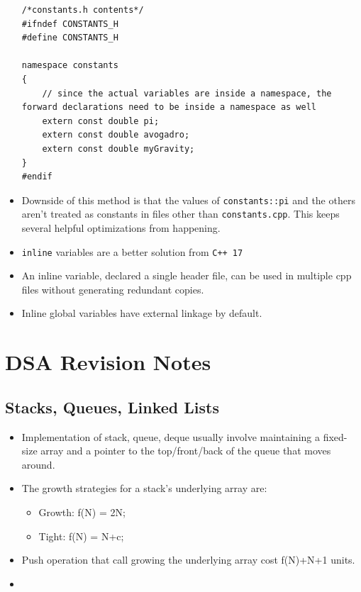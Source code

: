 \documentclass{report}
\begin{document}
\begin{itemize}
\begin{lstlisting}
/*constants.h contents*/
#ifndef CONSTANTS_H
#define CONSTANTS_H

namespace constants
{
    // since the actual variables are inside a namespace, the forward declarations need to be inside a namespace as well
    extern const double pi;
    extern const double avogadro;
    extern const double myGravity;
}
#endif
\end{lstlisting}
\item Downside of this method is that the values of \texttt{constants::pi} and the others aren't treated as constants in files other than \texttt{constants.cpp}. This keeps several helpful optimizations from happening.
\item \texttt{inline} variables are a better solution from \texttt{C++ 17}
\item An inline variable, declared a single header file, can be used in multiple cpp files without generating redundant copies.
\item Inline global variables have external linkage by default.
\end{itemize}
\chapter{DSA Revision Notes}
\section{Stacks, Queues, Linked Lists}
\begin{itemize}
\item Implementation of stack, queue, deque usually involve maintaining a
fixed-size array and a pointer to the top/front/back of the queue that moves around.
\item The growth strategies for a stack's underlying array are:
\begin{itemize}
    \item Growth: f(N) = 2N;
    \item Tight: f(N) = N+c;
\end{itemize}
\item Push operation that call growing the underlying array cost f(N)+N+1 units.
\item 
\end{itemize}
\end{document}
